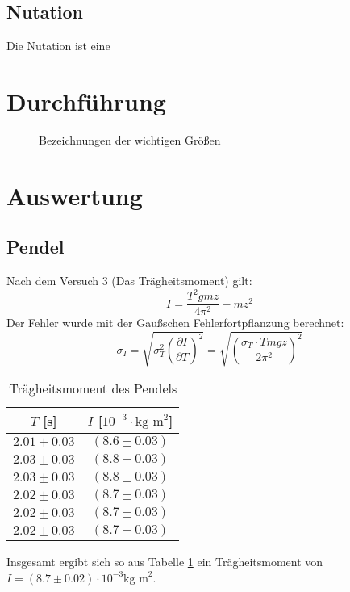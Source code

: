 \documentclass[12pt,a4paper,titlepage,headinclude,bibtotoc]{scrartcl}
\begin{document}
\subsection{Nutation}

 Die Nutation ist eine

 
\section{Durchführung}
\label{sec:durchfuehrung}

 \begin{figure}[!htb]
 \centering \def\svgwidth{100pt}
 
\caption{Bezeichnungen der wichtigen Größen\label{img:wichtigegr}}
 \end{figure}


\section{Auswertung}
\label{sec:auswertung}

\subsection{Pendel}
Nach dem Versuch 3 (Das Trägheitsmoment) gilt: $$I=\dfrac{T^2gmz}{4\pi^2}-mz^2$$
Der Fehler wurde mit der Gaußschen Fehlerfortpflanzung berechnet:
$$\sigma_I=\sqrt{\sigma_T^2\left(\dfrac{\partial I}{\partial T}\right)^2}=\sqrt{\left(\dfrac{\sigma_T\cdot Tmgz}{2\pi^2}\right)^2}$$
\begin{table}[!ht]
\centering
\begin{tabular}{|c|c|}
\hline 
$T$ [s] & $I$ [$10^{-3}\cdot \text{kg m}^2$] \\ 
\hline 
$2.01\pm 0.03$ & $(8.6\pm 0.03)$ \\ 
\hline 
$2.03\pm 0.03$ & $(8.8\pm 0.03)$\\ 
\hline
$2.03\pm 0.03$ & $(8.8\pm 0.03)$ \\ 
\hline 
$2.02\pm 0.03$ & $(8.7\pm 0.03)$ \\ 
\hline 
$2.02\pm 0.03$ & $(8.7\pm 0.03)$ \\ 
\hline 
$2.02\pm 0.03$ & $(8.7\pm 0.03)$ \\ 
\hline 
\end{tabular}
\caption{Trägheitsmoment des Pendels\label{tab:pendel}}
\end{table}
Insgesamt ergibt sich so aus Tabelle \ref{tab:pendel} ein Trägheitsmoment von \(I=(8.7\pm 0.02)\cdot 10^{-3}\text{kg m}^2\).
\end{document}
